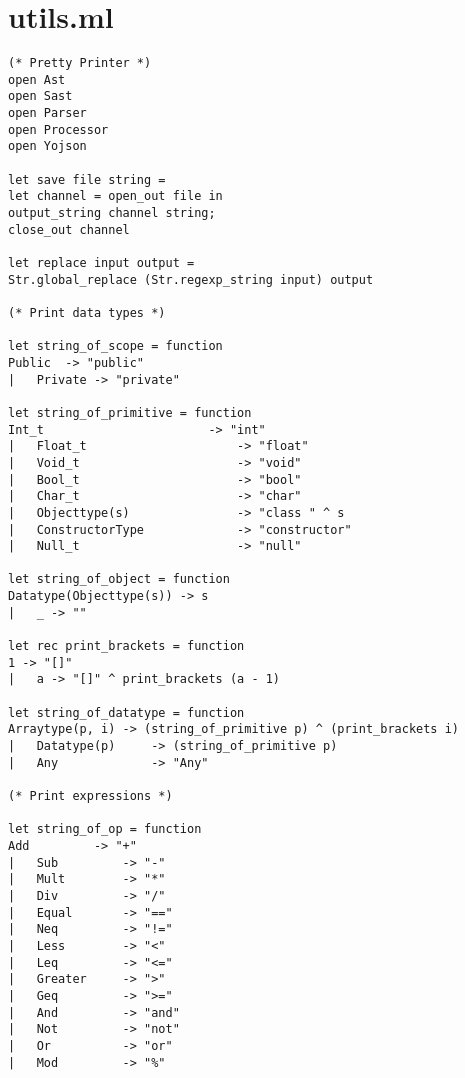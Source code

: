 \section{utils.ml}
\begin{verbatim}
(* Pretty Printer *)
open Ast
open Sast
open Parser
open Processor
open Yojson

let save file string =
let channel = open_out file in
output_string channel string;
close_out channel

let replace input output =
Str.global_replace (Str.regexp_string input) output

(* Print data types *)

let string_of_scope = function 
Public 	-> "public"
| 	Private -> "private"

let string_of_primitive = function 
Int_t 						-> "int"
| 	Float_t 					-> "float"
| 	Void_t						-> "void"
| 	Bool_t 						-> "bool"
| 	Char_t 						-> "char"
| 	Objecttype(s)				-> "class " ^ s
| 	ConstructorType				-> "constructor"
|  	Null_t 						-> "null"

let string_of_object = function
Datatype(Objecttype(s))	-> s
| 	_ -> ""

let rec print_brackets = function
1 -> "[]"
| 	a -> "[]" ^ print_brackets (a - 1)

let string_of_datatype = function 
Arraytype(p, i)	-> (string_of_primitive p) ^ (print_brackets i)
| 	Datatype(p)		-> (string_of_primitive p)
|  	Any 			-> "Any"

(* Print expressions *)

let string_of_op = function
Add			-> "+"	
| 	Sub			-> "-"	
| 	Mult		-> "*"	
| 	Div			-> "/"	
| 	Equal		-> "=="		
| 	Neq			-> "!="	
| 	Less		-> "<"	
| 	Leq			-> "<="	
| 	Greater		-> ">"			
| 	Geq			-> ">="	
| 	And			-> "and"	
| 	Not			-> "not"	
| 	Or			-> "or"
| 	Mod 		-> "%"


\end{verbatim}
